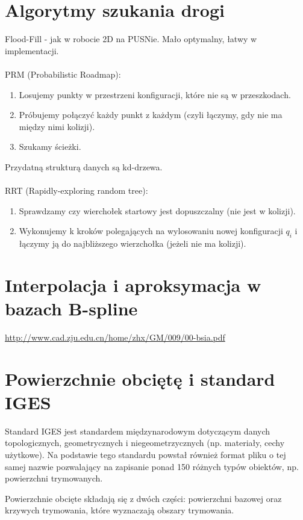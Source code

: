 \documentclass[12pt]{article}
\begin{document}
 \section{Algorytmy szukania drogi}
 Flood-Fill - jak w robocie 2D na PUSNie. Mało optymalny, łatwy w implementacji. \\
 ~\\
 PRM (Probabilistic Roadmap):
 \begin{enumerate}
 	\item Losujemy punkty w przestrzeni konfiguracji, które nie są w przeszkodach.
 	\item Próbujemy połączyć każdy punkt z każdym (czyli łączymy, gdy nie ma między nimi kolizji).
 	\item Szukamy ścieżki.
 \end{enumerate} 
Przydatną strukturą danych są kd-drzewa.\\
~\\
RRT (Rapidly-exploring random tree):
\begin{enumerate}
	\item Sprawdzamy czy wierchołek startowy jest dopuszczalny (nie jest w kolizji).
	\item Wykonujemy k kroków polegających na wylosowaniu nowej konfiguracji $q_{i}$ i łączymy ją do najbliższego wierzchołka (jeżeli nie ma kolizji).
\end{enumerate} 
 
\setcounter{section}{34}
\section{Interpolacja i aproksymacja w bazach B-spline}
\hyperlink{Prezentacja}{http://www.cad.zju.edu.cn/home/zhx/GM/009/00-bsia.pdf} 


\section{Powierzchnie obciętę i standard IGES}
Standard IGES jest standardem międzynarodowym dotyczącym danych topologicznych, geometrycznych i niegeometrzycznych (np. materiały, cechy użytkowe). Na podstawie tego standardu powstał również format pliku o tej samej nazwie pozwalający na zapisanie ponad 150 różnych typów obiektów, np. powierzchni trymowanych.

Powierzchnie obcięte składają się z dwóch części: powierzchni bazowej oraz krzywych trymowania, które wyznaczają obszary trymowania.
\end{document}
